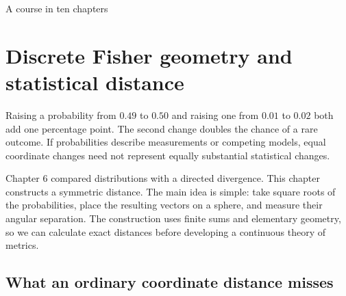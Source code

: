 \documentclass[11pt,oneside,openany]{book}
\theoremstyle{definition}
\theoremstyle{remark}
\numberwithin{equation}{chapter}
\begin{document}
\begin{titlepage}\color{ink}\centering\vspace*{1.0in}{\small\sffamily PROBABILITY AND MATHEMATICAL MODELLING\par}\vspace{.45in}{\Huge\bfseries Discrete Information\\[.12in]Geometry\par}\vspace{.35in}{\Large Finite Differences, Probability,\\and Information Flows\par}\vspace{1cm}{\Large Chapter 7\par}\vfill{}\vfill{\large A course in ten chapters\par}\end{titlepage}
\setcounter{chapter}{6}

\chapter{Discrete Fisher geometry and statistical distance}
Raising a probability from \(0.49\) to \(0.50\) and raising one from \(0.01\) to \(0.02\) both add one percentage point. The second change doubles the chance of a rare outcome. If probabilities describe measurements or competing models, equal coordinate changes need not represent equally substantial statistical changes.

Chapter 6 compared distributions with a directed divergence. This chapter constructs a symmetric distance. The main idea is simple: take square roots of the probabilities, place the resulting vectors on a sphere, and measure their angular separation. The construction uses finite sums and elementary geometry, so we can calculate exact distances before developing a continuous theory of metrics.

\section{What an ordinary coordinate distance misses}\label{ch07-what-an-ordinary-coordinate-distance-misses}
\end{document}
